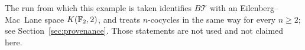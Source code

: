 \begin{remark}\label{rem:tower}
The run from which this example is taken identifies $B\mathcal T$ with an
Eilenberg--Mac~Lane space $K(\mathbb{F}_2,2)$, and treats $n$-cocycles in the same way
for every $n\ge2$; see Section~\ref{sec:provenance}. Those statements are not
used and not claimed here.
\end{remark}
